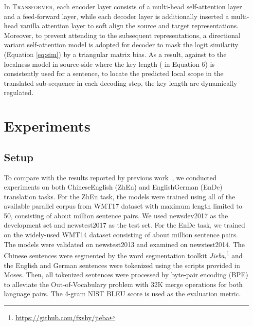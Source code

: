 \documentclass[11pt,a4paper]{article}
\begin{document}
In \textsc{Transformer}, each encoder layer consists of a multi-head self-attention layer and a feed-forward layer, while each decoder layer is additionally inserted a multi-head vanilla attention layer to soft align the source and target representations. Moreover, to prevent attending to the subsequent representations, a directional variant self-attention model \cite{shen2017disan} is adopted for decoder to mask the logit similarity (Equation \ref{eq:sim}) by a triangular matrix bias. As a result, against to  the localness model in source-side where the key length ( in Equation 6)  is consistently used for a sentence, to locate the predicted local scope in the translated sub-sequence in each decoding step, the key length are dynamically regulated. 










\fi




\section{Experiments}

\subsection{Setup}
\label{sec:setup}

To compare with the results reported by previous work~\cite{pmlr-v70-gehring17a,Vaswani:2017:NIPS,hassan2018achieving}, we conducted experiments on both ChineseEnglish (ZhEn) and EnglishGerman (EnDe) translation tasks.
For the ZhEn task, the models were trained using all of the available parallel corpus from WMT17 dataset with maximum length limited to 50, consisting of about  million sentence pairs. We used newsdev2017 as the development set and newstest2017 as the test set. 
For the EnDe task, we trained on the widely-used WMT14 dataset consisting of about  million sentence pairs.  The models were validated on  newstest2013 and examined on newstest2014. 
The Chinese sentences were segmented by the word segmentation toolkit {\em Jieba,}\footnote{\url{https://github.com/fxshy/jieba}} and the English and German sentences were tokenized using the scripts provided in Moses. 
Then, all tokenized sentences were processed by byte-pair encoding (BPE) to alleviate the Out-of-Vocabulary problem \cite{sennrich2015neural} with 32K merge operations for both language pairs.
The 4-gram NIST BLEU score \cite{papineni2002bleu} is used as the evaluation metric.
\end{document}
